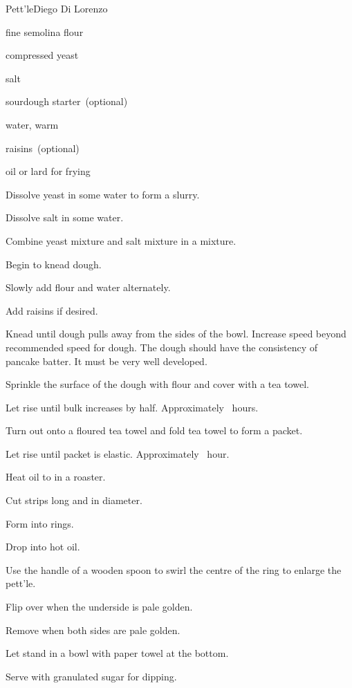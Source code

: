 \begin{recipe}{Pett'le\FIXME}{Diego Di Lorenzo}{}

\begin{ingredients}
\item {} fine semolina flour
\item {} compressed yeast
\item {} salt
\item {} sourdough starter~(optional)
\item {} water, warm
\item {} raisins~(optional)
\item oil or lard for frying
\end{ingredients}

\begin{directions}
\item Dissolve yeast in some water to form a slurry.
\item Dissolve salt in some water.
\item Combine yeast mixture and salt mixture in a mixture.
\item Begin to knead dough.
\item Slowly add flour and water alternately.
\item Add raisins if desired.
\item Knead until dough pulls away from the sides of the bowl. Increase speed beyond recommended speed for dough. The dough should have the consistency of pancake batter. It must be very well developed.
\item Sprinkle the surface of the dough with flour and cover with a tea towel.
\item Let rise until bulk increases by half. Approximately \threequarter{}~hours.
\item Turn out onto a floured tea towel and fold tea towel to form a packet.
\item Let rise until packet is elastic. Approximately \half{}~hour.
\item Heat oil to  in a roaster.
\item Cut strips  long and \inch{\threequarter} in diameter.
\item Form into rings.
\item Drop into hot oil.
\item Use the handle of a wooden spoon to swirl the centre of the ring to enlarge the pett'le.
\item Flip over when the underside is pale golden.
\item Remove when both sides are pale golden.
\item Let stand in a bowl with paper towel at the bottom.
\item Serve with granulated sugar for dipping.
\end{directions}

\end{recipe}
